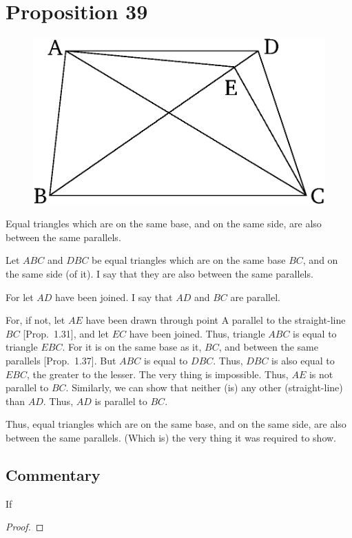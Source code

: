 \chapter*{Proposition 39}



\begin{figure}[ht]
    \begin{center}
    \includegraphics[width=0.5\linewidth]{figures/fig39e.eps}
    \label{fig:prop_39}
    \end{center}
\end{figure}

Equal triangles which are on the same base, and on the same side, are
also between the same parallels.

Let $ABC$ and $DBC$ be equal triangles which are on the same base $BC$,
and on the same side (of it). I say that they are also between the same parallels.

For let $AD$ have been joined. I say that $AD$ and $BC$ are parallel.

For, if not, let $AE$ have been drawn through point A parallel to the straight-line $BC$ [Prop.~1.31], and let $EC$ have been joined. Thus, triangle $ABC$ is equal
to triangle $EBC$. For it is on the same base as it, $BC$, and between the
same parallels [Prop.~1.37]. But $ABC$ is equal to $DBC$. Thus, $DBC$ is
also equal to $EBC$, the greater to the lesser. The very thing is impossible.
Thus, $AE$ is not parallel to $BC$. Similarly, we can show that neither (is)
any other (straight-line) than $AD$. Thus, $AD$ is parallel to $BC$.

Thus, equal triangles which are on the same base, and on the same side, are
also between the same parallels. (Which is) the very thing it was required to show.


\section*{Commentary}

\begin{proposition}\label{proposition_39}\leanok
    If
\end{proposition}
\begin{proof}
    \leanok
\end{proof}
